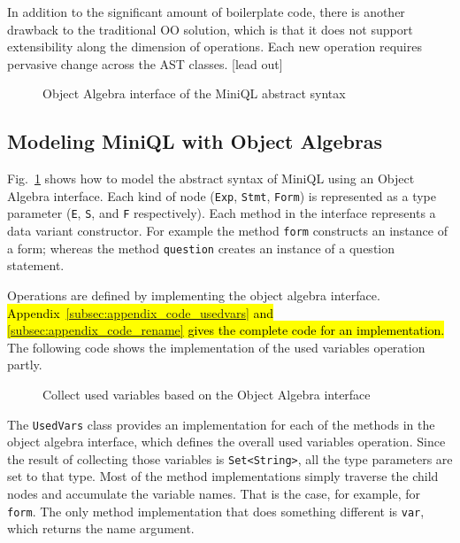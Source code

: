 In addition to the significant amount of boilerplate code, there is another  drawback to the traditional OO solution, which is that it does not support extensibility along the dimension of operations. Each new operation requires pervasive change across the AST classes.
[lead out]

\begin{figure}[t]
\nocaptionrule
\caption{Object Algebra interface of the MiniQL abstract syntax}
\label{ql_tree}
\end{figure}

\subsection{Modeling MiniQL with Object Algebras}\label{subsec:model_ql_with_oa}



Fig.~\ref{ql_tree} shows how  to model the abstract syntax of MiniQL
using an Object Algebra interface. Each kind of node (\lstinline{Exp}, \lstinline{Stmt}, \lstinline{Form})
is represented as a type parameter (\lstinline{E}, \lstinline{S}, and \lstinline{F} respectively).
Each method in the interface represents a data variant
constructor. For example the
method \lstinline{form} constructs an instance of a form; whereas the
method \lstinline{question} creates an instance of a question statement.

Operations are defined by implementing the object algebra interface. \hl{Appendix~\ref{subsec:appendix_code_usedvars} and \ref{subsec:appendix_code_rename} gives the complete code for an implementation.}
The following code shows the implementation of the used variables
operation partly.

\begin{figure}[t]
  \caption{Collect used variables based on the Object Algebra interface}
  \label{ql_usedvars}
\end{figure}

The \lstinline{UsedVars} class provides an implementation for each
of the methods in the object algebra interface, which defines the
overall used variables operation. Since the result of collecting those
variables is \lstinline{Set<String>}, all the type parameters are set to
that type. Most of the method implementations simply traverse the
child nodes and accumulate the variable names. That is the case, for
example, for \lstinline{form}. The only method implementation that does
something different is \lstinline{var}, which returns the name
argument.

